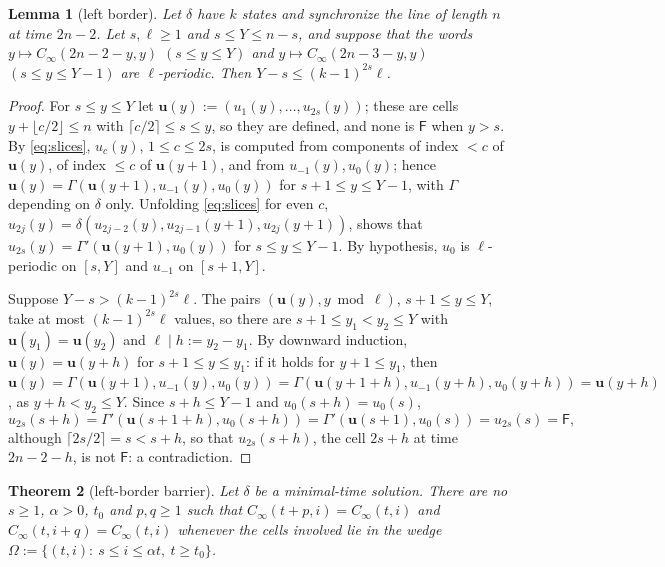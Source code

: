 \documentclass[3p]{elsarticle}
\newtheorem{theorem}{Theorem}[section]
\newtheorem{lemma}[theorem]{Lemma}
\theoremstyle{definition}
\newcommand{\Fq}{\mathsf F}
\begin{document}
\begin{lemma}[left border]\label{lem:left}
Let $\delta$ have $k$ states and synchronize the line of length $n$ at time
$2n-2$. Let $s,\ell\ge1$ and $s\le Y\le n-s$, and suppose that the words
$y\mapsto C_\infty(2n-2-y,y)$ $(s\le y\le Y)$ and $y\mapsto C_\infty(2n-3-y,y)$
$(s\le y\le Y-1)$ are $\ell$-periodic. Then $Y-s\le(k-1)^{2s}\ell$.
\end{lemma}

\begin{proof}
For $s\le y\le Y$ let $\mathbf u(y):=(u_1(y),\dots,u_{2s}(y))$; these are
cells $y+\lfloor c/2\rfloor\le n$ with $\lceil c/2\rceil\le s\le y$, so they
are defined, and none is $\Fq$ when $y>s$. By \eqref{eq:slices}, $u_c(y)$,
$1\le c\le 2s$, is computed from components of index $<c$ of $\mathbf u(y)$, of
index $\le c$ of $\mathbf u(y+1)$, and from $u_{-1}(y),u_0(y)$; hence
$\mathbf u(y)=\Gamma(\mathbf u(y+1),u_{-1}(y),u_0(y))$ for $s+1\le y\le Y-1$,
with $\Gamma$ depending on $\delta$ only. Unfolding \eqref{eq:slices} for even
$c$, $u_{2j}(y)=\delta(u_{2j-2}(y),u_{2j-1}(y+1),u_{2j}(y+1))$, shows that
$u_{2s}(y)=\Gamma'(\mathbf u(y+1),u_0(y))$ for $s\le y\le Y-1$. By hypothesis,
$u_0$ is $\ell$-periodic on $[s,Y]$ and $u_{-1}$ on $[s+1,Y]$.

Suppose $Y-s>(k-1)^{2s}\ell$. The pairs $(\mathbf u(y),y\bmod\ell)$,
$s+1\le y\le Y$, take at most $(k-1)^{2s}\ell$ values, so there are $s+1\le
y_1<y_2\le Y$ with $\mathbf u(y_1)=\mathbf u(y_2)$ and $\ell\mid h:=y_2-y_1$.
By downward induction, $\mathbf u(y)=\mathbf u(y+h)$ for $s+1\le y\le y_1$: if
it holds for $y+1\le y_1$, then $\mathbf u(y)=\Gamma(\mathbf
u(y+1),u_{-1}(y),u_0(y))=\Gamma(\mathbf u(y+1+h),u_{-1}(y+h),u_0(y+h))=\mathbf
u(y+h)$, as $y+h<y_2\le Y$. Since $s+h\le Y-1$ and $u_0(s+h)=u_0(s)$,
\[
u_{2s}(s+h)=\Gamma'(\mathbf u(s+1+h),u_0(s+h))=\Gamma'(\mathbf u(s+1),u_0(s))=u_{2s}(s)=\Fq,
\]
although $\lceil 2s/2\rceil=s<s+h$, so that $u_{2s}(s+h)$, the cell $2s+h$ at
time $2n-2-h$, is not $\Fq$: a contradiction.
\end{proof}

\begin{theorem}[left-border barrier]\label{thm:left}
Let $\delta$ be a minimal-time solution. There are no $s\ge1$, $\alpha>0$,
$t_0$ and $p,q\ge1$ such that $C_\infty(t+p,i)=C_\infty(t,i)$ and
$C_\infty(t,i+q)=C_\infty(t,i)$ whenever the cells involved lie in the wedge
$\Omega:=\{(t,i):\ s\le i\le\alpha t,\ t\ge t_0\}$.
\end{theorem}
\end{document}

